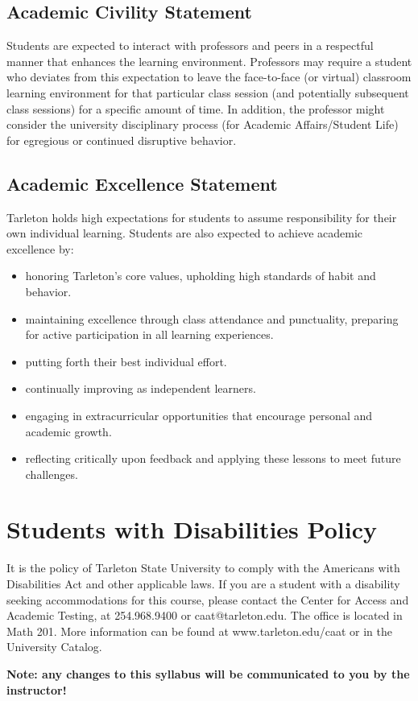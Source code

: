 \documentclass[10pt]{article}
\begin{document}
\subsection*{Academic Civility Statement}
\label{sec-9-2}
Students are expected to interact with professors and peers in a respectful manner that enhances the learning environment. Professors may require a student who deviates from this expectation to leave the face-to-face (or virtual) classroom learning environment for that particular class session (and potentially subsequent class sessions) for a specific amount of time. In addition, the professor might consider the university disciplinary process (for Academic Affairs/Student Life) for egregious or continued disruptive behavior.

\subsection*{Academic Excellence Statement}
\label{sec-9-3}
Tarleton holds high expectations for students to assume responsibility for their own individual learning. Students are also expected to achieve academic excellence by:
\begin{itemize}
\item honoring Tarleton’s core values, upholding high standards of habit and behavior.
\item maintaining excellence through class attendance and punctuality, preparing for active participation in all learning experiences.
\item putting forth their best individual effort.
\item continually improving as independent learners.
\item engaging in extracurricular opportunities that encourage personal and academic growth.
\item reflecting critically upon feedback and applying these lessons to meet future challenges.
\end{itemize}

\section*{Students with Disabilities Policy}
\label{sec-10}

It is the policy of Tarleton State University to comply with the Americans with Disabilities Act and other applicable laws. If you are a student with a disability seeking accommodations for this course, please contact the Center for Access and Academic Testing, at 254.968.9400 or caat@tarleton.edu. The office is located in Math 201. More information can be found at www.tarleton.edu/caat or in the University Catalog.

\textbf{\textbf{Note:  any changes to this syllabus will be communicated to you by the instructor!}}
\end{document}
